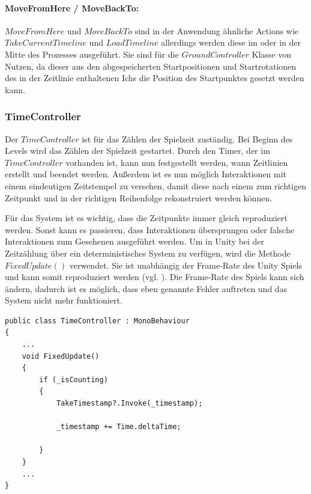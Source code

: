 \paragraph{MoveFromHere / MoveBackTo:}
$MoveFromHere$ und $MoveBackTo$ sind in der Anwendung ähnliche Actions wie $TakeCurrentTimeline$ und $LoadTimeline$ allerdings werden diese im  oder  in der Mitte des Prozesses ausgeführt. Sie sind für die $GroundController$ Klasse von Nutzen, da dieser aus den abgespeicherten Startpositionen und Startrotationen des in der Zeitlinie enthaltenen Ichs die Position des Startpunktes gesetzt werden kann.

\subsubsection{TimeController}
Der $TimeController$ ist für das Zählen der Spielzeit zuständig. Bei Beginn des Levels wird das Zählen der Spielzeit gestartet. Durch den Timer, der im $TimeController$ vorhanden ist, kann nun festgestellt werden, wann Zeitlinien erstellt und beendet werden. Außerdem ist es nun möglich Interaktionen mit einem eindeutigen Zeitstempel zu versehen, damit diese nach einem  zum richtigen Zeitpunkt und in der richtigen Reihenfolge rekonstruiert werden können. 

Für das System ist es wichtig, dass die Zeitpunkte immer gleich reproduziert werden. Sonst kann es passieren, dass Interaktionen übersprungen oder falsche Interaktionen zum Gesehenen ausgeführt werden. Um in Unity bei der Zeitzählung über ein deterministisches System zu verfügen, wird die Methode $FixedUpdate()$ verwendet. Sie ist unabhängig der Frame-Rate des Unity Spiels und kann somit reproduziert werden (vgl. \cite{technologies_unity_fu}). Die Frame-Rate des Spiels kann sich ändern, dadurch ist es möglich, dass eben genannte Fehler auftreten und das System nicht mehr funktioniert.
\newpage
\begin{lstlisting}[caption={Ausschnitt aus TimeController.ts dieses Prototyps}, label={sec:time-controller}]
public class TimeController : MonoBehaviour
{
    ...
    void FixedUpdate()
    {
        if (_isCounting)
        {
            TakeTimestamp?.Invoke(_timestamp);

            _timestamp += Time.deltaTime;

        }
    }
    ...
}
\end{lstlisting}


